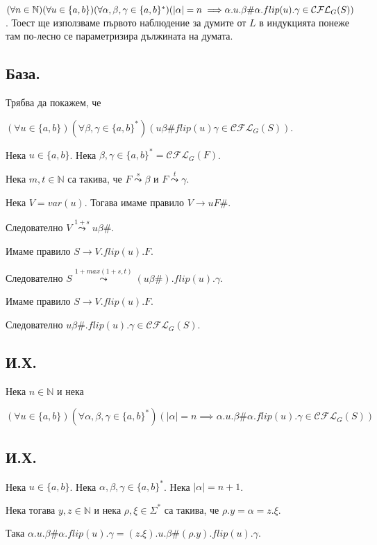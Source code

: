 \documentclass[12pt]{article}
\begin{document}
\((\forall n \in \mathbb{N})(\forall u \in \{a, b\})(\forall \alpha, \beta, \gamma \in \{a, b\}^*)(|\alpha| = n \implies \\ \alpha.u.\beta\#\alpha.flip(u).\gamma \in \mathcal{CFL}_G(S))\).
Тоест ще използваме първото наблюдение за думите от \(L\) в индукцията понеже там по-лесно се параметризира дължината на думата. 

\subsection*{База.}
Трябва да покажем, че

\((\forall u \in \{a, b\})(\forall \beta, \gamma \in \{a, b\}^*)(u\beta\#flip(u)\gamma \in \mathcal{CFL}_G(S))\).

Нека \(u \in \{a, b\}\). Нека \(\beta, \gamma \in \{a, b\}^* = \mathcal{CFL}_G(F)\).

Нека \(m, t \in \mathbb{N}\) са такива, че \(F \overset{s}{\leadsto} \beta\) и \(F \overset{t}{\leadsto} \gamma\).

Нека \(V = var(u)\). Тогава имаме правило \(V \to uF\#\).

Следователно \(V \overset{1 + s}{\leadsto} u\beta\#\).

Имаме правило \(S \to V.flip(u).F\).

Следователно \(S \overset{1 + max(1 + s, t)}{\leadsto} (u\beta\#).flip(u).\gamma\).

Имаме правило \(S \to V.flip(u).F\).

Следователно \(u\beta\#.flip(u).\gamma \in \mathcal{CFL}_G(S)\).

\subsection*{И.Х.}
Нека \(n \in \mathbb{N}\) и нека

\[(\forall u \in \{a, b\})(\forall \alpha, \beta, \gamma \in \{a, b\}^*)(|\alpha| = n \implies \alpha.u.\beta\#\alpha.flip(u).\gamma \in \mathcal{CFL}_G(S))\]

\subsection*{И.Х.}
Нека \(u \in \{a, b\}\). Нека \(\alpha, \beta, \gamma \in \{a, b\}^*\). Нека \(|\alpha| = n + 1\).

Нека тогава \(y, z \in \mathbb{N}\) и нека \(\rho, \xi \in \Sigma^*\) са такива, че \(\rho.y = \alpha = z.\xi\).

Така \(\alpha.u.\beta\#\alpha.flip(u).\gamma = (z.\xi).u.\beta\#(\rho.y).flip(u).\gamma\).
\end{document}
